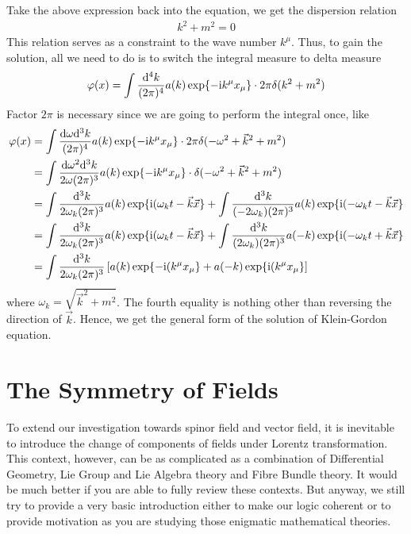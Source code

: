 \documentclass[letterpaper,10pt,english]{sphinxmanual}
\begin{document}
Take the above expression back into the equation, we get the dispersion relation
\begin{equation*}
\begin{split}k^2 + m^2 = 0\end{split}
\end{equation*}
This relation serves as a constraint to the wave number \(k^\mu\). Thus, to gain the solution, all we need to do is to switch the integral measure to delta measure
\begin{equation*}
\begin{split}\varphi(x) = \int{\mathrm d^4k\over(2\pi)^4}a(k)\exp\{-\mathrm i k^\mu x_\mu\}\cdot2\pi\delta(k^2+m^2)\end{split}
\end{equation*}
Factor \(2\pi\) is necessary since we are going to perform the integral once, like
\begin{equation*}
\begin{split}\varphi(x) &= \int{\mathrm d\omega \mathrm d^3k\over(2\pi)^4}a(k)\exp\{-\mathrm i k^\mu x_\mu\}\cdot2\pi\delta(-\omega^2 + \vec k^2 + m^2)\\
&= \int{\mathrm d\omega^2 \mathrm d^3k\over2\omega(2\pi)^3}a(k)\exp\{-\mathrm i k^\mu x_\mu\}\cdot\delta(-\omega^2 + \vec k^2 + m^2)\\
&= \int{\mathrm d^3k\over2\omega_k(2\pi)^3}a(k)\exp\{\mathrm i(\omega_k t - \vec k \vec x\} + \int{\mathrm d^3k\over(-2\omega_k)(2\pi)^3}a(k)\exp\{\mathrm i(-\omega_k t - \vec k \vec x\}\\
&= \int{\mathrm d^3k\over2\omega_k(2\pi)^3}a(k)\exp\{\mathrm i(\omega_k t - \vec k \vec x\} + \int{\mathrm d^3k\over(2\omega_k)(2\pi)^3}a(-k)\exp\{\mathrm i(-\omega_k t + \vec k \vec x\}\\
&= \int{\mathrm d^3k\over2\omega_k(2\pi)^3}\left[a(k)\exp\{-\mathrm i(k^\mu x_\mu\} + a(-k)\exp\{\mathrm i(k^\mu x_\mu\} \right]\end{split}
\end{equation*}
where \(\omega_k = \sqrt{\vec k^2 + m^2}\). The fourth equality is nothing other than reversing the direction of \(\vec k\). Hence, we get the general form of the solution of Klein-Gordon equation.


\section{The Symmetry of Fields}
\label{\detokenize{clstheo_sym_field::doc}}\label{\detokenize{clstheo_sym_field:the-symmetry-of-fields}}
To extend our investigation towards spinor field and vector field, it is inevitable to introduce the change of components of fields under Lorentz transformation. This context, however, can be as complicated as a combination of Differential Geometry, Lie Group and Lie Algebra theory and Fibre Bundle theory. It would be much better if you are able to fully review these contexts. But anyway, we still try to provide a very basic introduction either to make our logic coherent or to provide motivation as you are studying those enigmatic mathematical theories.
\end{document}
